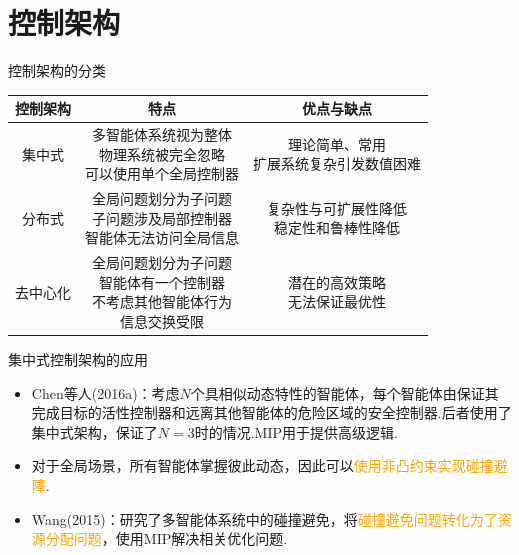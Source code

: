 \documentclass[notheorems,11pt]{beamer}
\theoremstyle{plain}
\numberwithin{theorem}{section}
\numberwithin{lemma}{section}
\numberwithin{corollary}{section}
\theoremstyle{example}
\newcommand{\hl}[1]{\textcolor{orange}{#1}}
\begin{document}
\section{控制架构}
\begin{frame}{控制架构的分类}
  \centering
  \begin{tabular}{|c|c|c|}
    \hline
    控制架构 & 特点 & 优点与缺点  \\
    \hline
    集中式 & \makecell[c]{多智能体系统视为整体\\物理系统被完全忽略\\可以使用单个全局控制器} & \makecell{理论简单、常用\\扩展系统复杂引发数值困难}\\ 
    \hline
    分布式 & \makecell[c]{全局问题划分为子问题\\子问题涉及局部控制器\\智能体无法访问全局信息} & \makecell{复杂性与可扩展性降低\\稳定性和鲁棒性降低}\\
    \hline
    去中心化 & \makecell[c]{全局问题划分为子问题\\智能体有一个控制器\\不考虑其他智能体行为\\信息交换受限} & \makecell{潜在的高效策略\\无法保证最优性}\\
    \hline
  \end{tabular}
\end{frame}

\begin{frame}{集中式控制架构的应用}
  \begin{itemize}
    \item Chen等人(2016a)：考虑$N$个具相似动态特性的智能体，每个智能体由保证其完成目标的活性控制器和远离其他智能体的危险区域的安全控制器.后者使用了集中式架构，保证了$N=3$时的情况.MIP用于提供高级逻辑.
    \item 对于全局场景，所有智能体掌握彼此动态，因此可以\hl{使用非凸约束实现碰撞避障}.
    \item Wang(2015)：研究了多智能体系统中的碰撞避免，将\hl{碰撞避免问题转化为了资源分配问题}，使用MIP解决相关优化问题.
  \end{itemize}
\end{frame}
\end{document}
